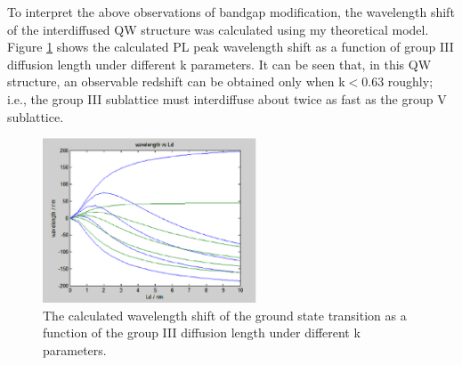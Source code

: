To interpret the above observations of bandgap modification,
the wavelength shift of the interdiffused QW structure was calculated using
my theoretical model. Figure \ref{my_redshift} shows the calculated PL peak
wavelength shift as a function of group III diffusion length under different k
parameters. It can be seen that, in this QW structure, an observable redshift
can be obtained only when k$<$0.63 roughly; i.e., the group III sublattice must
interdiffuse about twice as fast as the group V sublattice.

\begin{figure}[!t]
    \centering
    \includegraphics[width=2.5in]{fig/red}
    \caption{The calculated wavelength shift of the ground state transition
        as a function of the group III diffusion length under different k parameters.}
    \label{my_redshift}
\end{figure}
